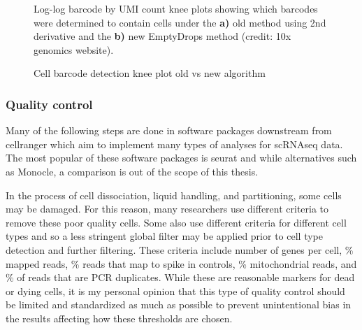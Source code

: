 \begin{figure}[htbp!]
\caption{Cell barcode detection knee plot old vs new algorithm}
\label{figure:knee}
\begin{centering}
\par{Log-log barcode by UMI count knee plots showing which barcodes were determined to contain cells under the \textbf{a)} old method using 2nd derivative and the \textbf{b)} new EmptyDrops method (credit: 10x genomics website).}
\end{centering}
\end{figure}

\subsubsection{Quality control}

\par{
Many of the following steps are done in software packages downstream from cellranger which aim to implement many types of analyses for scRNAseq data. The most popular of these software packages is seurat\cite{seurat1}\cite{seurat2} and while alternatives such as Monocle\cite{monocle}, a comparison is out of the scope of this thesis.
} \\

\par{ In the process of cell dissociation, liquid handling, and partitioning, some cells may be damaged. For this reason, many researchers use different criteria to remove these poor quality cells. Some also use different criteria for different cell types and so a less stringent global filter may be applied prior to cell type detection and further filtering. These criteria include number of genes per cell, \% mapped reads, \% reads that map to spike in controls, \% mitochondrial reads, and \% of reads that are PCR duplicates. While these are reasonable markers for dead or dying cells\cite{osorio}\cite{ilicic}, it is my personal opinion that this type of quality control should be limited and standardized as much as possible to prevent unintentional bias in the results affecting how these thresholds are chosen. 
}


